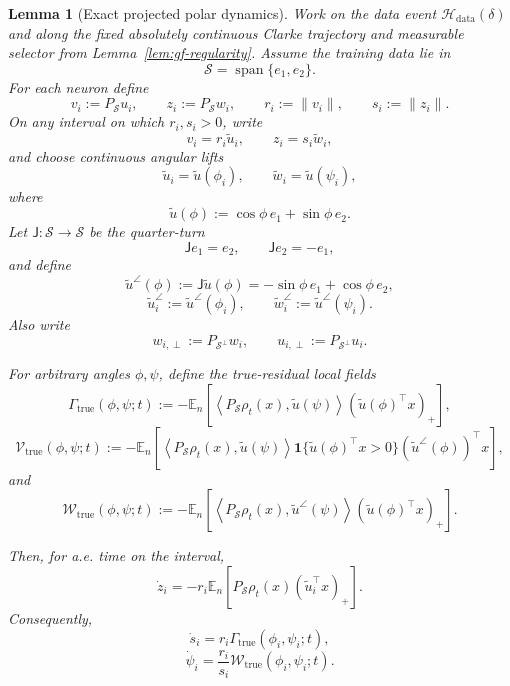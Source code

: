 \documentclass{article} %
\theoremstyle{plain}
\newtheorem{lemma}[theorem]{Lemma}
\theoremstyle{definition}
\theoremstyle{remark}
\begin{document}

\begin{lemma}[Exact projected polar dynamics]
\label{lem:projected-polar-dynamics}
Work on the data event $\mathcal H_{\mathrm{data}}(\delta)$ and along the
fixed absolutely continuous Clarke trajectory and measurable selector from
Lemma~\ref{lem:gf-regularity}.  Assume the training data lie in
\[
\mathcal S=\operatorname{span}\{e_1,e_2\}.
\]
For each neuron define
\[
v_i:=P_{\mathcal S}u_i,
\qquad
z_i:=P_{\mathcal S}w_i,
\qquad
r_i:=\|v_i\|,
\qquad
s_i:=\|z_i\|.
\]
On any interval on which $r_i,s_i>0$, write
\[
v_i=r_i\widetilde u_i,
\qquad
z_i=s_i\widetilde w_i,
\]
and choose continuous angular lifts
\[
\widetilde u_i=\widetilde u(\phi_i),
\qquad
\widetilde w_i=\widetilde u(\psi_i),
\]
where
\[
\widetilde u(\phi)
:=
\cos\phi\,e_1+\sin\phi\,e_2.
\]
Let $\mathsf J:\mathcal S\to\mathcal S$ be the quarter-turn
\[
\mathsf Je_1=e_2,
\qquad
\mathsf Je_2=-e_1,
\]
and define
\[
\widetilde u^\angle(\phi)
:=
\mathsf J\widetilde u(\phi)
=
-\sin\phi\,e_1+\cos\phi\,e_2,
\]
\[
\widetilde u_i^\angle
:=
\widetilde u^\angle(\phi_i),
\qquad
\widetilde w_i^\angle
:=
\widetilde u^\angle(\psi_i).
\]
Also write
\[
w_{i,\perp}:=P_{\mathcal S^\perp}w_i,
\qquad
u_{i,\perp}:=P_{\mathcal S^\perp}u_i.
\]

For arbitrary angles $\phi,\psi$, define the true-residual local fields
\[
\boxed{
\Gamma_{\mathrm{true}}(\phi,\psi;t)
:=
-\mathbb E_n
\left[
\left\langle
P_{\mathcal S}\rho_t(x),
\widetilde u(\psi)
\right\rangle
(\widetilde u(\phi)^\top x)_+
\right],
}
\]
\[
\boxed{
\mathcal V_{\mathrm{true}}(\phi,\psi;t)
:=
-\mathbb E_n
\left[
\left\langle
P_{\mathcal S}\rho_t(x),
\widetilde u(\psi)
\right\rangle
\mathbf 1\{\widetilde u(\phi)^\top x>0\}
(\widetilde u^\angle(\phi))^\top x
\right],
}
\]
and
\[
\boxed{
\mathcal W_{\mathrm{true}}(\phi,\psi;t)
:=
-\mathbb E_n
\left[
\left\langle
P_{\mathcal S}\rho_t(x),
\widetilde u^\angle(\psi)
\right\rangle
(\widetilde u(\phi)^\top x)_+
\right].
}
\]

Then, for a.e. time on the interval,
\[
\boxed{
\dot z_i
=
-r_i
\mathbb E_n
\left[
P_{\mathcal S}\rho_t(x)
(\widetilde u_i^\top x)_+
\right].
}
\]
Consequently,
\[
\boxed{
\dot s_i
=
r_i\Gamma_{\mathrm{true}}(\phi_i,\psi_i;t),
}
\]
\[
\boxed{
\dot\psi_i
=
\frac{r_i}{s_i}
\mathcal W_{\mathrm{true}}(\phi_i,\psi_i;t).
}
\]


\end{lemma}
\end{document}
